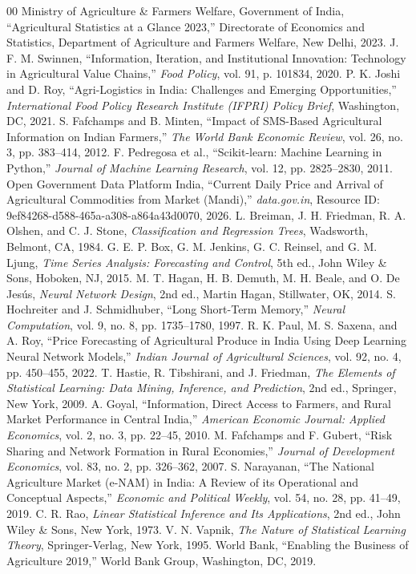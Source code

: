 \documentclass[conference]{IEEEtran}
\begin{document}
\begin{thebibliography}{00}
 Ministry of Agriculture \& Farmers Welfare, Government of India, ``Agricultural Statistics at a Glance 2023,'' Directorate of Economics and Statistics, Department of Agriculture and Farmers Welfare, New Delhi, 2023.
 J. F. M. Swinnen, ``Information, Iteration, and Institutional Innovation: Technology in Agricultural Value Chains,'' \textit{Food Policy}, vol. 91, p. 101834, 2020.
 P. K. Joshi and D. Roy, ``Agri-Logistics in India: Challenges and Emerging Opportunities,'' \textit{International Food Policy Research Institute (IFPRI) Policy Brief}, Washington, DC, 2021.
 S. Fafchamps and B. Minten, ``Impact of SMS-Based Agricultural Information on Indian Farmers,'' \textit{The World Bank Economic Review}, vol. 26, no. 3, pp. 383--414, 2012.
 F. Pedregosa et al., ``Scikit-learn: Machine Learning in Python,'' \textit{Journal of Machine Learning Research}, vol. 12, pp. 2825--2830, 2011.
 Open Government Data Platform India, ``Current Daily Price and Arrival of Agricultural Commodities from Market (Mandi),'' \textit{data.gov.in}, Resource ID: 9ef84268-d588-465a-a308-a864a43d0070, 2026.
 L. Breiman, J. H. Friedman, R. A. Olshen, and C. J. Stone, \textit{Classification and Regression Trees}, Wadsworth, Belmont, CA, 1984.
 G. E. P. Box, G. M. Jenkins, G. C. Reinsel, and G. M. Ljung, \textit{Time Series Analysis: Forecasting and Control}, 5th ed., John Wiley \& Sons, Hoboken, NJ, 2015.
 M. T. Hagan, H. B. Demuth, M. H. Beale, and O. De Jes{\'u}s, \textit{Neural Network Design}, 2nd ed., Martin Hagan, Stillwater, OK, 2014.
 S. Hochreiter and J. Schmidhuber, ``Long Short-Term Memory,'' \textit{Neural Computation}, vol. 9, no. 8, pp. 1735--1780, 1997.
 R. K. Paul, M. S. Saxena, and A. Roy, ``Price Forecasting of Agricultural Produce in India Using Deep Learning Neural Network Models,'' \textit{Indian Journal of Agricultural Sciences}, vol. 92, no. 4, pp. 450--455, 2022.
 T. Hastie, R. Tibshirani, and J. Friedman, \textit{The Elements of Statistical Learning: Data Mining, Inference, and Prediction}, 2nd ed., Springer, New York, 2009.
 A. Goyal, ``Information, Direct Access to Farmers, and Rural Market Performance in Central India,'' \textit{American Economic Journal: Applied Economics}, vol. 2, no. 3, pp. 22--45, 2010.
 M. Fafchamps and F. Gubert, ``Risk Sharing and Network Formation in Rural Economies,'' \textit{Journal of Development Economics}, vol. 83, no. 2, pp. 326--362, 2007.
 S. Narayanan, ``The National Agriculture Market (e-NAM) in India: A Review of its Operational and Conceptual Aspects,'' \textit{Economic and Political Weekly}, vol. 54, no. 28, pp. 41--49, 2019.
 C. R. Rao, \textit{Linear Statistical Inference and Its Applications}, 2nd ed., John Wiley \& Sons, New York, 1973.
 V. N. Vapnik, \textit{The Nature of Statistical Learning Theory}, Springer-Verlag, New York, 1995.
 World Bank, ``Enabling the Business of Agriculture 2019,'' World Bank Group, Washington, DC, 2019.
\end{thebibliography}
\end{document}
